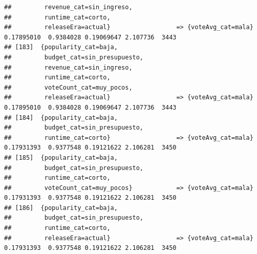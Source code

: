 \documentclass[
]{article}
\begin{document}
\begin{verbatim}
##         revenue_cat=sin_ingreso,                                                                                                
##         runtime_cat=corto,                                                                                                      
##         releaseEra=actual}                  => {voteAvg_cat=mala}                0.17895010  0.9384028 0.19069647 2.107736  3443
## [183]  {popularity_cat=baja,                                                                                                    
##         budget_cat=sin_presupuesto,                                                                                             
##         revenue_cat=sin_ingreso,                                                                                                
##         runtime_cat=corto,                                                                                                      
##         voteCount_cat=muy_pocos,                                                                                                
##         releaseEra=actual}                  => {voteAvg_cat=mala}                0.17895010  0.9384028 0.19069647 2.107736  3443
## [184]  {popularity_cat=baja,                                                                                                    
##         budget_cat=sin_presupuesto,                                                                                             
##         runtime_cat=corto}                  => {voteAvg_cat=mala}                0.17931393  0.9377548 0.19121622 2.106281  3450
## [185]  {popularity_cat=baja,                                                                                                    
##         budget_cat=sin_presupuesto,                                                                                             
##         runtime_cat=corto,                                                                                                      
##         voteCount_cat=muy_pocos}            => {voteAvg_cat=mala}                0.17931393  0.9377548 0.19121622 2.106281  3450
## [186]  {popularity_cat=baja,                                                                                                    
##         budget_cat=sin_presupuesto,                                                                                             
##         runtime_cat=corto,                                                                                                      
##         releaseEra=actual}                  => {voteAvg_cat=mala}                0.17931393  0.9377548 0.19121622 2.106281  3450

\end{verbatim}
\end{document}
